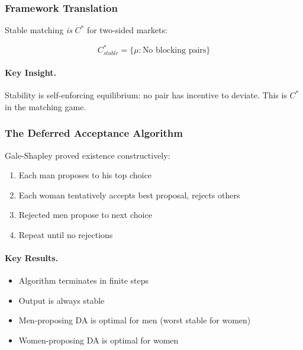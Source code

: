 \subsubsection{Framework Translation}

Stable matching \textit{is} $C^*$ for two-sided markets:

\begin{equation}
\boxed{
C^*_{stable} = \{\mu : \text{No blocking pairs}\}
}
\label{eq:stable-cstar}
\end{equation}

\paragraph{Key Insight.}
Stability is self-enforcing equilibrium: no pair has incentive to deviate.
This is $C^*$ in the matching game.

\subsubsection{The Deferred Acceptance Algorithm}

Gale-Shapley proved existence constructively:

\begin{algorithm}
\begin{enumerate}
    \item Each man proposes to his top choice
    \item Each woman tentatively accepts best proposal, rejects others
    \item Rejected men propose to next choice
    \item Repeat until no rejections
\end{enumerate}
\end{algorithm}

\paragraph{Key Results.}
\begin{itemize}
    \item Algorithm terminates in finite steps
    \item Output is always stable
    \item Men-proposing DA is optimal for men (worst stable for women)
    \item Women-proposing DA is optimal for women
\end{itemize}

